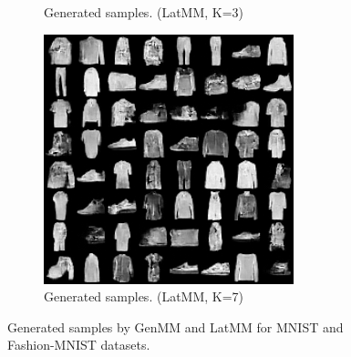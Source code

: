 \begin{figure}[!t]
\begin{subfigure}[b]{0.24\textwidth}
    \caption{Generated samples. (LatMM, K=3)}
  \end{subfigure}
  \begin{subfigure}[b]{0.24\textwidth}
    \centering
    \includegraphics[width=1\linewidth]{images/fashion-mnist/samples/gen_s7_std1.png}
    \caption{Generated samples. (LatMM, K=7)}
  \end{subfigure}
  \caption{Generated samples by GenMM and LatMM for MNIST and Fashion-MNIST datasets.}\label{fig-demo-samples}
\end{figure}
      
